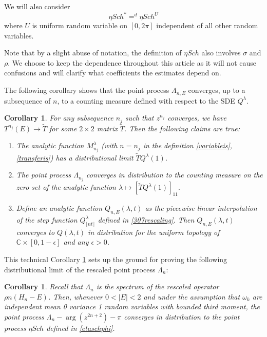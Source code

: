 \documentclass[12pt, reqno]{amsart}
\newtheorem{corollary}[theorem]{Corollary}
\theoremstyle{definition}
\theoremstyle{remark}
\numberwithin{equation}{section}
\begin{document}
We will also consider $$\eta Sch^*=^d\eta Sch^U$$ where $U$ is uniform random variable on $[0,2\pi]$ independent of all other random variables.

Note that by a slight abuse of notation, the definition of $\eta Sch$ also involves $\sigma$ and $\rho$. We choose to keep the dependence throughout this article as it will not cause confusions and will clarify what coefficients the estimates depend on.



The following corollary shows that the point process $\Lambda_{n,E}$ converges, up to a subsequence of $n$, to a counting measure defined with respect to the SDE $Q^\lambda$.

\begin{corollary}\label{convergenceprocess}
    For any subsequence $n_j$ such that $z^{n_j}$ converges, we have $T^{n_j}(E)\to\tilde{T}$ for some $2\times 2$ matrix $\tilde{T}$. Then the following claims are true:\begin{enumerate}
        \item The analytic function $M_{n_j}^\lambda$ (with $n=n_j$ in the definition \eqref{variableis},\eqref{transferis}) has a distributional limit $\tilde{T}Q^\lambda(1)$. \item The point process $\Lambda_{n_j}$ converges in distribution to the counting measure on the zero set of the analytic function $\lambda\mapsto [\tilde{T}Q^\lambda(1)]_{11}.$
        \item Define an analytic function $Q_{n,E}(\lambda,t)$ as the piecewise linear interpolation of the step function $Q^\lambda_{\lfloor nt\rfloor}$ defined in \eqref{307rescaling}. Then $Q_{n,E}(\lambda,t)$ converges to $Q(\lambda,t)$ in distribution for the uniform topology of $\mathbb{C}\times[0,1-\epsilon]$ and any $\epsilon>0$.
    \end{enumerate}
\end{corollary}

This technical Corollary \ref{convergenceprocess} sets up the ground for proving the following distributional limit of the rescaled point process $\Lambda_n$:

\begin{corollary}\label{corollary1.4}
    Recall that $\Lambda_n$ is the spectrum of the rescaled operator $\rho n(H_n-E)$. Then, whenever $0<|E|<2$ and under the assumption that $\omega_k$ are independent mean 0 variance 1 random variables with bounded third moment, the point process $\Lambda_n-\arg(z^{2n+2})-\pi$ converges in distribution to the point process 
    $\eta Sch$ defined in \eqref{etaschphi}.
\end{corollary}
\end{document}
